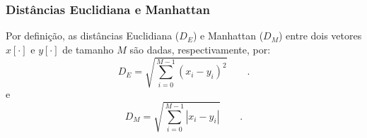 \begin{frame}
	\frametitle{Distâncias Euclidiana e Manhattan}
		\par Por definição, as distâncias Euclidiana ($D_E$) e Manhattan ($D_M$) entre dois vetores $x[\cdot]$ e $y[\cdot]$ de tamanho $M$ são dadas, respectivamente, por:
		\begin{equation}
			D_E = \sqrt{\sum\limits_{i=0}^{M-1}(x_i - y_i)^2}  
			\qquad. 
		\end{equation}
		e
		\begin{equation}
			D_M = \sqrt{\sum\limits_{i=0}^{M-1}|x_i - y_i|}   
			\qquad. 
		\end{equation}
\end{frame}

